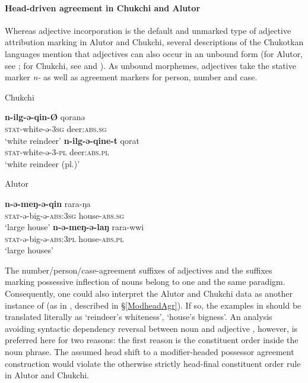 \paragraph*{Head\hyp{}driven agreement in Chukchi and Alutor}
Whereas adjective incorporation is the default and unmarked type of adjective attribution marking in Alutor and Chukchi, several descriptions of the Chukotkan languages mention that adjectives can also occur in an unbound form (for Alutor, see \citealt{nagayama2003}; for Chukchi, see \citealt[103–104, 421–429]{skorik1960} and \citealt[251]{comrie1981}). As unbound morphemes, adjectives take the stative marker \textit{n-} as well as agreement markers for person, number and case.
\begin{exe}
\ex
\label{chukchi alutor free adj}
\begin{xlist}
\ex \rm{Chukchi \citep{skorik1960}}
\begin{xlist}
\ex
\gll	\textbf{n-ilg-ə-qin-Ø} qoranə\\
	\textsc{stat}-white-ə-\textsc{3sg} deer:\textsc{abs.sg}\\
\glt	‘white reindeer’
\ex
\gll	\textbf{n-ilg-ə-qine-t} qorat\\
	\textsc{stat}-white-ə-3-\textsc{pl} deer:\textsc{abs.pl}\\
\glt	‘white reindeer (pl.)’
\end{xlist}
\ex \rm{Alutor \citep{nagayama2003}}
\begin{xlist}
\ex
\gll	\textbf{n-ə-meŋ-ə-qin} rara-ŋa\\
	\textsc{stat}-ə-big-ə-\textsc{abs:3sg} house-\textsc{abs.sg}\\
\glt	‘large house’
\ex
\gll	\textbf{n-ə-meŋ-ə-laŋ} rara-wwi\\
	\textsc{stat}-ə-big-ə-\textsc{abs:3pl} house-\textsc{abs.pl}\\
\glt	‘large houses’
\end{xlist}
\end{xlist}
\end{exe}
The number/person/case-agreement suffixes of adjectives and the suffixes marking possessive inflection of nouns belong to one and the same paradigm. Consequently, one could also interpret the Alutor and Chukchi data as another instance of  (as in , described in \S\ref{ModheadAgr}). If so, the examples in  should be translated literally as ‘reindeer's whiteness’, ‘house's bigness’. An analysis avoiding syntactic dependency reversal between noun and adjective \citep[cf.][]{malchukov2000}, however, is preferred here for two reasons: the first reason is the constituent order inside the noun phrase. The assumed head shift to a modifier\hyp{}headed possessor agreement construction would violate the otherwise strictly head-final constituent order rule in Alutor and Chukchi. 

